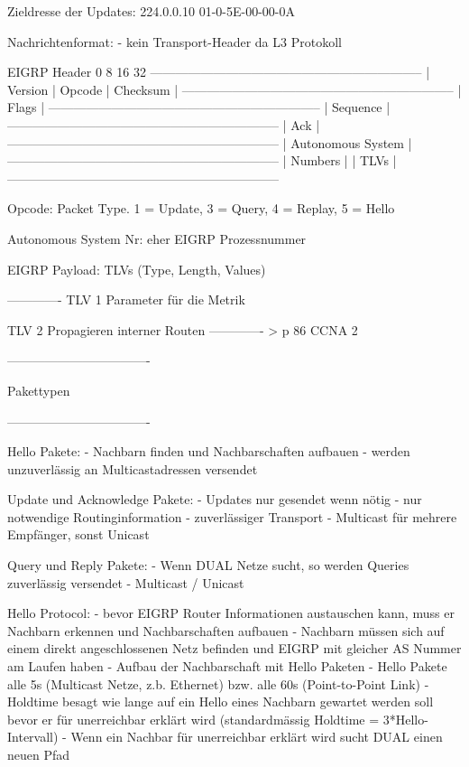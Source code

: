 \documentclass[11pt,a4paper]{article}
\begin{document}
Zieldresse der Updates:
224.0.0.10
01-0-5E-00-00-0A

Nachrichtenformat:
- kein Transport-Header da L3 Protokoll

EIGRP Header
0		8		16				32
-----------------------------------------------------------------
| Version	| Opcode	|	Checksum		| 
-----------------------------------------------------------------
|			Flags					|
-----------------------------------------------------------------
|			Sequence				|
-----------------------------------------------------------------
|			Ack 					|
-----------------------------------------------------------------
|			Autonomous System			|
-----------------------------------------------------------------
|			Numbers					|
|			TLVs					|
-----------------------------------------------------------------

Opcode:	
Packet Type. 1 = Update, 3 = Query, 4 = Replay, 5 = Hello

Autonomous System Nr:
eher EIGRP Prozessnummer

EIGRP Payload:
TLVs (Type, Length, Values)

-------------
TLV 1 Parameter für die Metrik

TLV 2 Propagieren interner Routen
------------- > p 86 CCNA 2


----------------------------------

	Pakettypen

----------------------------------

Hello Pakete:
- Nachbarn finden und Nachbarschaften aufbauen
- werden unzuverlässig an Multicastadressen versendet

Update und Acknowledge Pakete:
- Updates nur gesendet wenn nötig
- nur notwendige Routinginformation
- zuverlässiger Transport
- Multicast für mehrere Empfänger, sonst Unicast

Query und Reply Pakete:
- Wenn DUAL Netze sucht, so werden Queries zuverlässig versendet
- Multicast / Unicast


Hello Protocol:
- bevor EIGRP Router Informationen austauschen kann, muss er 
Nachbarn erkennen und Nachbarschaften aufbauen
- Nachbarn müssen sich auf einem direkt angeschlossenen Netz 
befinden und EIGRP mit gleicher AS Nummer am Laufen haben
- Aufbau der Nachbarschaft mit Hello Paketen
- Hello Pakete alle 5s (Multicast Netze, z.b. Ethernet) bzw. alle 
60s (Point-to-Point Link)
- Holdtime besagt wie lange auf ein Hello eines Nachbarn gewartet 
werden soll bevor er für unerreichbar erklärt wird (standardmässig 
Holdtime = 3*Hello-Intervall)
- Wenn ein Nachbar für unerreichbar erklärt wird sucht DUAL einen 
neuen Pfad
\end{document}
